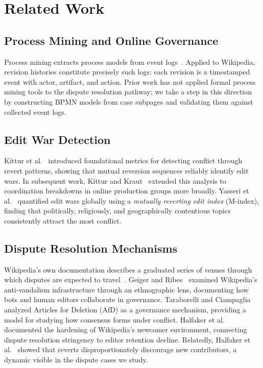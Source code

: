 \documentclass[conference]{IEEEtran}
\begin{document}
\section{Related Work}

\subsection{Process Mining and Online Governance}

Process mining extracts process models from event logs~\cite{b_vander2012}.
Applied to Wikipedia, revision histories constitute precisely such logs:
each revision is a timestamped event with actor, artifact, and action. Prior
work has not applied formal process mining tools to the dispute resolution
pathway; we take a step in this direction by constructing BPMN models from
case subpages and validating them against collected event logs.

\subsection{Edit War Detection}

Kittur et al.~\cite{b_kittur2007} introduced foundational metrics for detecting
conflict through revert patterns, showing that mutual reversion sequences
reliably identify edit wars. In subsequent work, Kittur and
Kraut~\cite{b_kittur2010} extended this analysis to coordination breakdowns in
online production groups more broadly. Yasseri et al.~\cite{b_yasseri2012}
quantified edit wars globally using a \emph{mutually reverting edit index}
(M-index), finding that politically, religiously, and geographically
contentious topics consistently attract the most conflict.

\subsection{Dispute Resolution Mechanisms}

Wikipedia's own documentation describes a graduated series of venues through
which disputes are expected to travel~\cite{b_wp_disputes}.
Geiger and Ribes~\cite{b_geiger2010} examined Wikipedia's anti-vandalism
infrastructure through an ethnographic lens, documenting how bots and human
editors collaborate in governance. Taraborelli and Ciampaglia~\cite{b_taraborelli2010}
analyzed Articles for Deletion (AfD) as a governance mechanism, providing a
model for studying how consensus forms under conflict. Halfaker et
al.~\cite{b_halfaker2013} documented the hardening of Wikipedia's newcomer
environment, connecting dispute resolution stringency to editor retention
decline. Relatedly, Halfaker et al.~\cite{b_halfaker2011} showed that reverts
disproportionately discourage new contributors, a dynamic visible in the
dispute cases we study.
\end{document}

